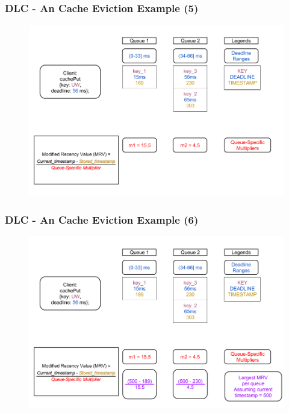 \documentclass{beamer}
\begin{document}
\begin{frame}
  \frametitle{DLC - An Cache Eviction Example (5)}
  \begin{figure}
    \begin{center}
      \centerline{\includegraphics[scale=0.33]{img/DLC_V5_5.png}}
    \end{center}
  \end{figure}
\end{frame}

\begin{frame}
  \frametitle{DLC - An Cache Eviction Example (6)}
  \begin{figure}
    \begin{center}
      \centerline{\includegraphics[scale=0.33]{img/DLC_V5_6.png}}
    \end{center}
  \end{figure}
\end{frame}
\end{document}
